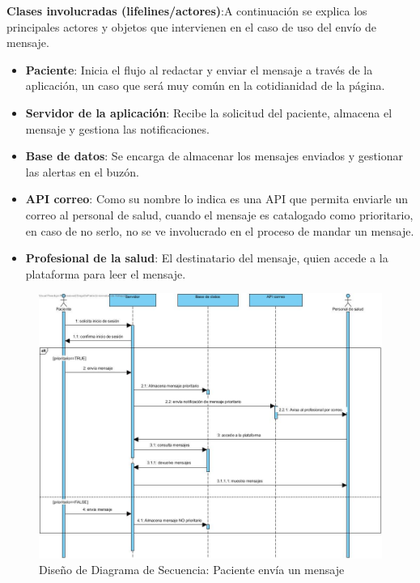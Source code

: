 \documentclass{article}
\begin{document}
\textbf{Clases involucradas (lifelines/actores)}:A continuación se explica los principales actores y objetos que intervienen en el caso de uso del envío de mensaje.
\begin{itemize}
	\item \textbf{Paciente}: Inicia el flujo al redactar y enviar el mensaje a través de la aplicación, un caso que será muy común en la cotidianidad de la página.
	\item \textbf{Servidor de la aplicación}: Recibe la solicitud del paciente, almacena el mensaje y gestiona las notificaciones.
	\item \textbf{Base de datos}: Se encarga de almacenar los mensajes enviados y gestionar las alertas en el buzón.
	\item \textbf{API correo}: Como su nombre lo indica es una API que permita enviarle un correo al personal de salud, cuando el mensaje es catalogado como prioritario, en caso de no serlo, no se ve involucrado en el proceso de mandar un mensaje.
	\item \textbf{Profesional de la salud}: El destinatario del mensaje, quien accede a la plataforma para leer el mensaje.
\end{itemize}

\begin{figure}[h!]
	\begin{center} 
		\includegraphics[width=1\textwidth]{images/Diagrama_de_secuencia_rehabilitacion.jpg}
		\caption{Diseño de Diagrama de Secuencia: Paciente envía un mensaje}
		\label{fig:secuencia_diagrama}
	\end{center}
\end{figure}
\end{document}
